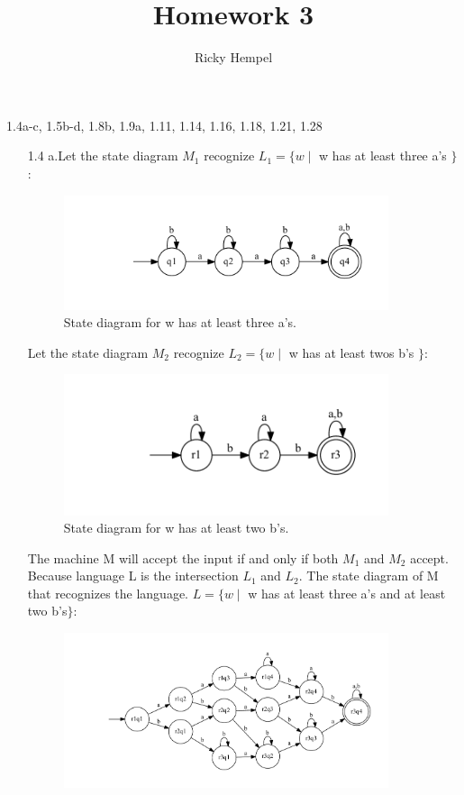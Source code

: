 \documentclass[10pt] {article}
\title{Homework 3 }
\author{Ricky Hempel}
\begin{document}
\maketitle
\begin{center}
1.4a-c, 1.5b-d, 1.8b, 1.9a, 1.11, 1.14, 1.16, 1.18, 1.21, 1.28
\end{center}
\begin{enumerate}
\item[1.4]
a.Let the state diagram $M_1$ recognize 
$L_1 = \{ w \mid$ w has at least three a's $\}$:
\begin{figure}[H]
\includegraphics[width=0.9\textwidth]{a14.pdf}
\caption{State diagram for w has at least three a's.}
\label{1}
\end{figure} 
Let the state diagram $M_2$ recognize 
$L_2 = \{ w \mid$ w has at least twos b's $\}$:
\begin{figure}[H]
\includegraphics[width=0.9\textwidth]{ab14.pdf}
\caption{State diagram for w has at least two b's.}
\label{2}
\end{figure}
The machine M will accept the input if and only if both $M_1$ and $M_2$ accept. Because language L is the intersection $L_1$ and $L_2$.
The state diagram of M that recognizes the language. $L = \{ w \mid$ w has at least three a's and at least two b's$\}$: 
\begin{figure}[H]
\includegraphics[width=0.9\textwidth]{ac14.pdf}

\end{figure}
\end{enumerate}
\end{document}

